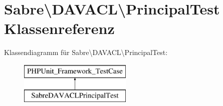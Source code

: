 \hypertarget{class_sabre_1_1_d_a_v_a_c_l_1_1_principal_test}{}\section{Sabre\textbackslash{}D\+A\+V\+A\+CL\textbackslash{}Principal\+Test Klassenreferenz}
\label{class_sabre_1_1_d_a_v_a_c_l_1_1_principal_test}
Klassendiagramm für Sabre\textbackslash{}D\+A\+V\+A\+CL\textbackslash{}Principal\+Test\+:\begin{figure}[H]
\begin{center}
\leavevmode
\includegraphics[height=2.000000cm]{class_sabre_1_1_d_a_v_a_c_l_1_1_principal_test}
\end{center}
\end{figure}
